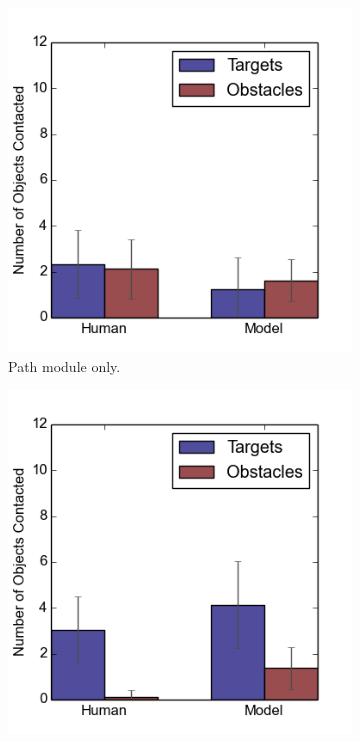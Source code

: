 \begin{figure}[h]
\centering
\begin{subfigure}[b]{0.24\textwidth}
\includegraphics[width=\textwidth]{contact1.png}
\caption{Path module only. }
\end{subfigure}
\begin{subfigure}[b]{0.24\textwidth}
\includegraphics[width=\textwidth]{contact2.png}

\end{subfigure}
\end{figure}
